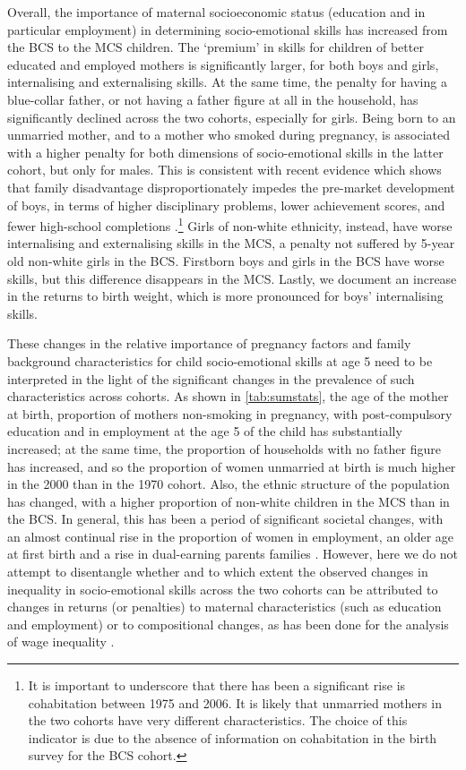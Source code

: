 Overall, the importance of maternal socioeconomic status (education and in particular employment) in determining socio-emotional skills has increased from the BCS to the MCS children. The `premium' in skills for children of better educated and employed mothers is significantly larger, for both boys and girls, internalising and externalising skills. At the same time, the penalty for having a blue-collar father, or not having a father figure at all in the household, has significantly declined across the two cohorts, especially for girls. Being born to an unmarried mother, and to a mother who smoked during pregnancy, is associated with a higher penalty for both dimensions of socio-emotional skills in the latter cohort, but only for males. This is consistent with recent evidence which shows that family disadvantage disproportionately impedes the pre-market development of boys, in terms of higher disciplinary problems, lower achievement scores, and fewer high-school completions \citep{Autor2016a}.\footnote{It is important to underscore that there has been a significant rise is cohabitation between 1975 and 2006. It is likely that unmarried mothers in the two cohorts have very different characteristics. The choice of this indicator is due to the absence of information on cohabitation in the birth survey for the BCS cohort.} Girls of non-white ethnicity, instead, have worse internalising and externalising skills in the MCS, a penalty not suffered by 5-year old non-white girls in the BCS. Firstborn boys and girls in the BCS have worse skills, but this difference disappears in the MCS. Lastly, we document an increase in the returns to birth weight, which is more pronounced for boys' internalising skills.

These changes in the relative importance of pregnancy factors and family background characteristics for child socio-emotional skills at age 5 need to be interpreted in the light of the significant changes in the prevalence of such characteristics across cohorts. As shown in \autoref{tab:sumstats}, the age of the mother at birth, proportion of mothers non-smoking in pregnancy, with post-compulsory education and in employment at the age 5 of the child has substantially increased; at the same time, the proportion of households with no father figure has increased, and so the proportion of women unmarried at birth is much higher in the 2000 than in the 1970 cohort. Also, the ethnic structure of the population has changed, with a higher proportion of non-white children in the MCS than in the BCS. In general, this has been a period of significant societal changes, with an almost continual rise in the proportion of women in employment, an older age at first birth and a rise in dual-earning parents families \citep{Roantree2018}. However, here we do not attempt to disentangle whether and to which extent the observed changes in inequality in socio-emotional skills across the two cohorts can be attributed to changes in returns (or penalties) to maternal characteristics (such as education and employment) or to compositional changes, as has been done for the analysis of wage inequality \citep{Blundell2007}.

